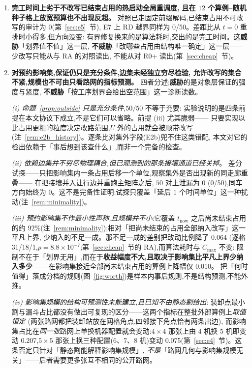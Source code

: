 \documentclass[manuscript,screen,review]{acmart}
\newcommand{\NPairs}{50}
\newcommand{\PassInvar}{\NPairs/\NPairs}     %
\newcommand{\RzeroPastLo}{0}
\newcommand{\EfiveCells}{12}        %
\newcommand{\ClosureAliveFrac}{92\%}
\newcommand{\PubCloSpread}{0.207}
\newcommand{\PubCloSpreadBig}{0.075}
\newcommand{\RedecodeBad}{0/\NPairs}
\newcommand{\RAStabWTL}{31/18/1}     %
\newcommand{\RAStabP}{8.8\times10^{-7}}  %
\newcommand{\RAStabMean}{0.064}      %
\newcommand{\ProbeLeakPairs}{0/50}
\newcommand{\ProbeLeaks}{0}
\begin{document}
\begin{enumerate}[leftmargin=1.6em,itemsep=0.35em]
\item \textbf{完工时间上劣于不改写已结束占用的热启动全局重调度,
且在 \(\EfiveCells\) 个算例--随机种子格上放宽预算也不出现反超。}
对照已走固定前缀解码,已结束占用不可改写的审计为 \(\RzeroPastLo\)(第~\ref{sec:e5}~节),
E7 上 RD 越界同样为 \RedecodeBad。差距比从 \(t=0\) 重排时小得多,但方向没变:
有界修复换来的是算法耗时,交出的是完工时间。这\textbf{威胁}「划界值不值」这一层,
\textbf{不威胁}「改哪些占用由结构唯一确定」这一层——少改写只能从与 RA 的对照读出,
不能从对 R0+ 读出(第~\ref{sec:cheap}~节)。

\item \textbf{对预约影响集,保证仍只是充分条件,边集未经独立穷尽检验,
允许改写的集合不紧,规模也不可由只看路网的指标预测。}
四者分述;\textbf{威胁}的是对象层保证的强度与紧度,
\textbf{不威胁}「按工序划界会给出空范围」这一诊断读数。

\emph{(i) 命题~\ref{prop:outside} 只是充分条件},\(\PassInvar\) 不等于充要:
实验说明的是四条前提在本文协议下成立,不是它们可以省略。前提 (iii) 尤其脆弱——
只要实现以比占用更粗的粒度决定改路范围,\(U\) 外的占用就会被顺带改写
(注~\ref{rem:e2b_history})。逐条比对集外字段(E2b)兜不住这类错配,
本文对它的检出依赖于「事后想到该查什么」,而非一个完备的检查。

\emph{(ii) 依赖边集并不穷尽物理耦合,但已观测到的那条接壤通道已经关掉}。
差分试探——只把影响集内一条占用后移一个单位,观察集外是否出现新的同走廊重叠——
在把接壤并入让行边并重跑主矩阵之后, \(\NPairs\) 对上泄漏为 \ProbeLeaks
(\ProbeLeakPairs),同车方向始终为 \(0\)。这不是完备性证明:试探只覆盖「延后 \(1\)
个时间单位」这一种扰动(注~\ref{rem:minimality})。

\emph{(iii) 预约影响集不作最小性声称,且规模并不小}:它覆盖 \(t_{\mathrm{now}}\) 之后尚未结束占用的约
\(\ClosureAliveFrac\)(注~\ref{rem:minimality});相对「把尚未结束的占用全部纳入改写」这一平凡上界,
少纳入的不足一成。那不足一成的差别把改动比例降了 \RAStabMean
(逐格 \RAStabWTL,\(p=\RAStabP\);第~\ref{sec:cheap}~节的 RA),而算法耗时与 \(C_{\max}\) 不变:
限制不在于「划界无用」,而在于\textbf{收益幅度不大,且取决于影响集比平凡上界少纳入多少}——
在影响集接近全部尚未结束占用的算例上降幅仅 \(0.010\)。
把「何时值得」落成分档的规则(图~\ref{fig:worth})是样本内事后规则,不是结构预测,不能外推。

\emph{(iv) 影响集规模的结构可预测性未能建立,且已知不由静态割给出}:
装卸点最小割与漏斗占比都没有做出可复现的区分——这两个指标在整批外部算例上\emph{取值恒定}
(两张路网都把装卸站放在网格角点,四邻接下角点恰有两条出边),
而影响集占比在\emph{同一张}路网上单换机器配置就会变动:\(4\times 4\) 那张上由 \(4\) 机换
\(5\) 机即变动 \PubCloSpread,\(5\times 5\) 那张上换三种配置(\(6\)、\(7\)、\(8\) 机)变动
\PubCloSpreadBig(第~\ref{sec:e4}~节)。这条否定只针对「静态割能解释影响集规模」,
\emph{不是}「路网几何与影响集规模无关」——后者需要更多张互不相同的公开路网。


\end{enumerate}
\end{document}
